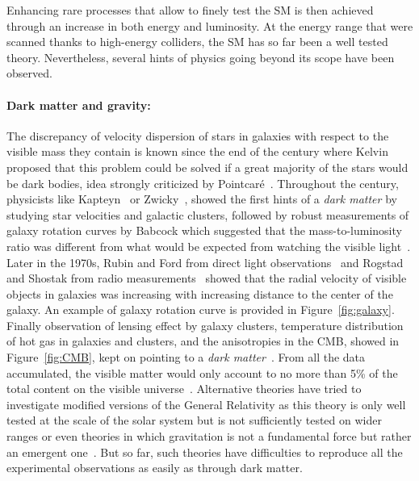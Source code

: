 	Enhancing rare processes that allow to finely test the \acl{SM} is then achieved through an increase in both energy and luminosity. At the energy range that were scanned thanks to high-energy colliders, the SM has so far been a well tested theory. Nevertheless, several hints of physics going beyond its scope have been observed.
	
	\paragraph*{Dark matter and gravity: }
	
	The discrepancy of velocity dispersion of stars in galaxies with respect to the visible mass they contain is known since the end of the  century where Kelvin proposed that this problem could be solved if a great majority of the stars would be dark bodies, idea strongly criticized by Pointcaré~\cite{POINTCARE1906}. Throughout the  century, physicists like Kapteyn~\cite{KAPTEYN1922} or Zwicky~\cite{ZWICKY1933,ZWICKY1937}, showed the first hints of a \textit{dark matter} by studying star velocities and galactic clusters, followed by robust measurements of galaxy rotation curves by Babcock which suggested that the mass-to-luminosity ratio was different from what would be expected from watching the visible light~\cite{BABCOCK1939}. Later in the 1970s, Rubin and Ford from direct light observations~\cite{RUNBIN1970} and Rogstad and Shostak from radio measurements~\cite{ROGSTAD1972} showed that the radial velocity of visible objects in galaxies was increasing with increasing distance to the center of the galaxy. An example of galaxy rotation curve is provided in Figure~\ref{fig:galaxy}. Finally observation of lensing effect by galaxy clusters, temperature distribution of hot gas in galaxies and clusters, and the anisotropies in the \acf{CMB}, showed in Figure~\ref{fig:CMB}, kept on pointing to a \textit{dark matter}~\cite{PLANK2016}. From all the data accumulated, the visible matter would only account to no more than 5\% of the total content on the visible universe~\cite{JAROSIK2011}. Alternative theories have tried to investigate modified versions of the General Relativity as this theory is only well tested at the scale of the solar system but is not sufficiently tested on wider ranges or even theories in which gravitation is not a fundamental force but rather an emergent one~\cite{VERLINDE2016,MAEDER2017}. But so far, such theories have difficulties to reproduce all the experimental observations as easily as through dark matter.
	
